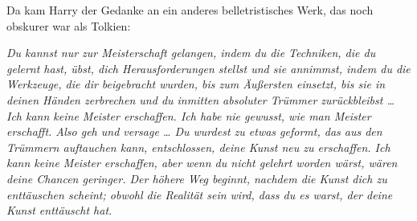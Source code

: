 Da kam Harry der Gedanke an ein anderes belletristisches Werk, das noch obskurer war als Tolkien:

\emph{Du kannst nur zur Meisterschaft gelangen, indem du die Techniken, die du gelernt hast, übst, dich Herausforderungen stellst und sie annimmst, indem du die Werkzeuge, die dir beigebracht wurden, bis zum Äußersten einsetzt, bis sie in deinen Händen zerbrechen und du inmitten absoluter Trümmer zurückbleibst … Ich kann keine Meister erschaffen. Ich habe nie gewusst, wie man Meister erschafft. Also geh und versage … Du wurdest zu etwas geformt, das aus den Trümmern auftauchen kann, entschlossen, deine Kunst neu zu erschaffen. Ich kann keine Meister erschaffen, aber wenn du nicht gelehrt worden wärst, wären deine Chancen geringer. Der höhere Weg beginnt, nachdem die Kunst dich zu enttäuschen scheint; obwohl die Realität sein wird, dass du es warst, der deine Kunst enttäuscht hat.}

